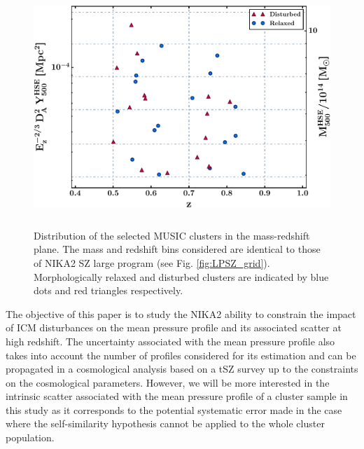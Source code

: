 \documentclass[twocolumn,traditabstract]{aa}
\begin{document}
\begin{figure}[h!]
\centering
\includegraphics[height=9cm]{Simulated_NIKA2_sample.pdf}
\caption{{\footnotesize Distribution of the selected MUSIC clusters in the mass-redshift plane. The mass and redshift bins considered are identical to those of NIKA2 SZ large program (see Fig. \ref{fig:LPSZ_grid}). Morphologically relaxed and disturbed clusters are indicated by blue dots and red triangles respectively.}}
\label{fig:MUSIC_NIKA2_sample}
\end{figure}

The objective of this paper is to study the NIKA2 ability to constrain the impact of ICM disturbances on the mean pressure profile and its associated scatter at high redshift. The uncertainty associated with the mean pressure profile also takes into account the number of profiles considered for its estimation and can be propagated in a cosmological analysis based on a tSZ survey up to the constraints on the cosmological parameters. However, we will be more interested in the intrinsic scatter associated with the mean pressure profile of a cluster sample in this study as it corresponds to the potential systematic error made in the case where the self-similarity hypothesis cannot be applied to the whole cluster population.\\
\end{document}
